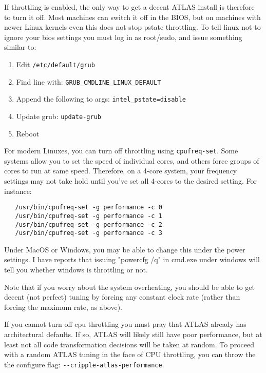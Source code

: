 \documentclass[11pt]{article}
\begin{document}
If throttling is enabled, the only way to get a decent ATLAS install is
therefore to turn it off.  Most machines can switch it off in the BIOS,
but on machines with newer Linux kernels even this does not stop pstate
throttling.  To tell linux not to ignore your bios settings you must
log in as root/sudo, and issue something similar to:
\begin{enumerate}
\item Edit \verb+/etc/default/grub+
\item Find line with: \verb+GRUB_CMDLINE_LINUX_DEFAULT+
\item Append the following to args: \verb+intel_pstate=disable+
\item Update grub: \verb+update-grub+
\item Reboot
\end{enumerate}

For modern Linuxes, you can turn off throttling using \verb+cpufreq-set+.
Some systems allow you to set the speed of individual cores, and others
force groups of cores to run at same speed.  Therefore, on a 4-core
system, your frequency settings may not take hold until you've set all
4-cores to the desired setting.  For instance:
\begin{verbatim}
   /usr/bin/cpufreq-set -g performance -c 0
   /usr/bin/cpufreq-set -g performance -c 1
   /usr/bin/cpufreq-set -g performance -c 2
   /usr/bin/cpufreq-set -g performance -c 3
\end{verbatim}

Under MacOS or Windows, you may be able to change this under the power settings.
I have reports that issuing "powercfg /q" in cmd.exe under windows will tell
you whether windows is throttling or not.

Note that if you worry about the system overheating, you should be able to
get decent (not perfect) tuning by forcing any constant clock rate (rather
than forcing the maximum rate, as above).

If you cannot turn off cpu throttling you must pray that ATLAS already
has architectural defaults.  If so, ATLAS will likely still have poor
performance, but at least not all code transformation decisions will be
taken at random.  To proceed with a random ATLAS tuning in the face
of CPU throttling, you can throw the the configure flag:
\verb+--cripple-atlas-performance+.
\clearpage
\end{document}
